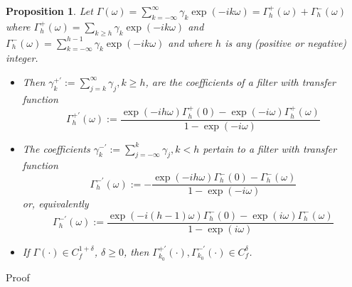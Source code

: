 \documentclass[11pt]{article}
\newtheorem{Proposition}{Proposition}
\begin{document}
\begin{appendix}
\begin{Proposition}\label{fwns}
 Let $\Gamma(\omega)=\sum_{k=-\infty}^{\infty}\gamma_k\exp(-ik\omega)=\Gamma_{h}^+(\omega)+\Gamma_{h}^-(\omega)$ where $\Gamma_{h}^+(\omega)=\sum_{k\geq h}\gamma_k\exp(-ik\omega)$ and $\Gamma_{h}^-(\omega)=\sum_{k=-\infty}^{h-1}\gamma_k\exp(-ik\omega)$ and where $h$ is any (positive or negative) integer.
\begin{itemize}
\item Then $\gamma_{k}^{+'}:=\sum_{j=k}^\infty\gamma_{j}, k\geq h$, are the
coefficients of a filter with transfer function
\begin{equation}\label{intfil}
\Gamma_{h}^{+'}(\omega):=\frac{\exp(-ih\omega)\Gamma_{h}^+(0)-\exp(-i\omega)\Gamma_{h}^+(\omega)}{1-\exp(-i\omega)}
\end{equation}
\item The coefficients
$\gamma_k^{-'}:=\sum_{j=-\infty}^{k}\gamma_{j}, k<h$ pertain to a filter with transfer function
\begin{equation}\label{intfil2}
\Gamma_{h}^{-'}(\omega):=-\frac{\exp(-ih\omega)\Gamma_{h}^-(0)-\Gamma_{h}^-(\omega)}{1-\exp(-i\omega)}
\end{equation}
or, equivalently
\begin{equation}\label{intfil3}
\Gamma_{h}^{-'}(\omega):=\frac{\exp(-i(h-1)\omega)\Gamma_{h}^-(0)-\exp(i\omega)\Gamma_{h}^-(\omega)}{1-\exp(i\omega)}
\end{equation}
\item If $\Gamma(\cdot)\in C_f^{1+\delta}$, $\delta\geq 0$, then $\Gamma_{k_0}^{+'}(\cdot), \Gamma_{k_0}^{-'}(\cdot)\in
C_f^{\delta}$.
\end{itemize}
\end{Proposition}
Proof\\


\end{appendix}
\end{document}
